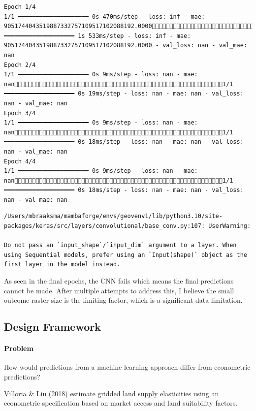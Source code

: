 \documentclass[
  letterpaper,
]{article}
\let\oldparagraph\paragraph
\renewcommand{\paragraph}[1]{\oldparagraph{#1}\mbox{}}
\begin{document}
\begin{verbatim}
Epoch 1/4
1/1 ━━━━━━━━━━━━━━━━━━━━ 0s 470ms/step - loss: inf - mae: 9051744043519887332757109517102088192.00001/1 ━━━━━━━━━━━━━━━━━━━━ 1s 533ms/step - loss: inf - mae: 9051744043519887332757109517102088192.0000 - val_loss: nan - val_mae: nan
Epoch 2/4
1/1 ━━━━━━━━━━━━━━━━━━━━ 0s 9ms/step - loss: nan - mae: nan1/1 ━━━━━━━━━━━━━━━━━━━━ 0s 19ms/step - loss: nan - mae: nan - val_loss: nan - val_mae: nan
Epoch 3/4
1/1 ━━━━━━━━━━━━━━━━━━━━ 0s 9ms/step - loss: nan - mae: nan1/1 ━━━━━━━━━━━━━━━━━━━━ 0s 18ms/step - loss: nan - mae: nan - val_loss: nan - val_mae: nan
Epoch 4/4
1/1 ━━━━━━━━━━━━━━━━━━━━ 0s 9ms/step - loss: nan - mae: nan1/1 ━━━━━━━━━━━━━━━━━━━━ 0s 18ms/step - loss: nan - mae: nan - val_loss: nan - val_mae: nan
\end{verbatim}

\begin{verbatim}
/Users/mbraaksma/mambaforge/envs/geovenv1/lib/python3.10/site-packages/keras/src/layers/convolutional/base_conv.py:107: UserWarning:

Do not pass an `input_shape`/`input_dim` argument to a layer. When using Sequential models, prefer using an `Input(shape)` object as the first layer in the model instead.
\end{verbatim}

As seen in the final epochs, the CNN fails which means the final
predictions cannot be made. After multiple attempts to address this, I
believe the small outcome raster size is the limiting factor, which is a
significant data limitation.

\subsection{Design Framework}\label{design-framework}

\paragraph{Problem}\label{problem}

How would predictions from a machine learning approach differ from
econometric predictions?

Villoria \& Liu (2018) estimate gridded land supply elasticities using
an econometric specification based on market access and land suitability
factors.
\end{document}
